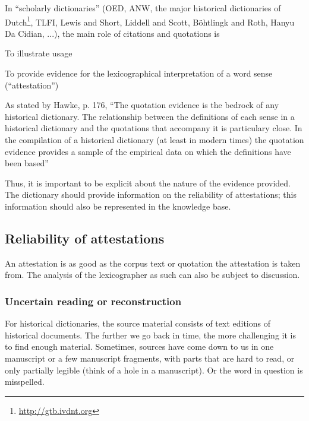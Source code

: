 \documentclass[10pt]{article}
\let\tempeone\enumerate
\let\tempetwo\endenumerate
\renewenvironment{enumerate}{\tempeone\setlength\itemsep{-0.5pt}\setlength{\partopsep}{-0.5pt}\setlength{\parsep}{-0.5pt}\setlength{\topsep}{-0.5pt}}{\tempetwo}
\begin{document}
In ``scholarly dictionaries'' (OED, ANW, the major historical dictionaries of Dutch\footnote{\url{http://gtb.ivdnt.org}}, TLFI, Lewis and Short, Liddell and Scott, Böhtlingk and Roth, Hanyu Da Cidian, ...), the main role of citations and quotations is 
\begin{enumerate}
    \item To illustrate usage
    \item To provide evidence for the lexicographical interpretation of a word sense (``attestation'')
\end{enumerate}

As stated by Hawke, \cite{Hawke} p. 176, ``The quotation evidence is the bedrock of any historical dictionary. The relationship between the definitions of each sense in a historical dictionary and the quotations that accompany it is particulary close. In the compilation of a historical dictionary (at least in modern times) the quotation evidence provides a sample of the empirical data on which the definitions have been based''

Thus, it is important to be explicit about the nature of the evidence provided. The dictionary should provide information on the reliability of attestations; this information should also be represented in the knowledge base. 

\subsection{Reliability of attestations}



 An attestation is as good as the corpus text or quotation the attestation is taken from. The analysis of the lexicographer as such can also be subject to discussion.\par

\subsubsection*{Uncertain reading or reconstruction}


For historical dictionaries, the source material consists of text editions of historical documents. The further we go back in time, the more challenging it is to find enough material. Sometimes, sources have come down to us in one manuscript or a few manuscript fragments, with parts that are hard to read, or only partially legible (think of a hole in a manuscript). Or the word in question is misspelled.\par
\end{document}
